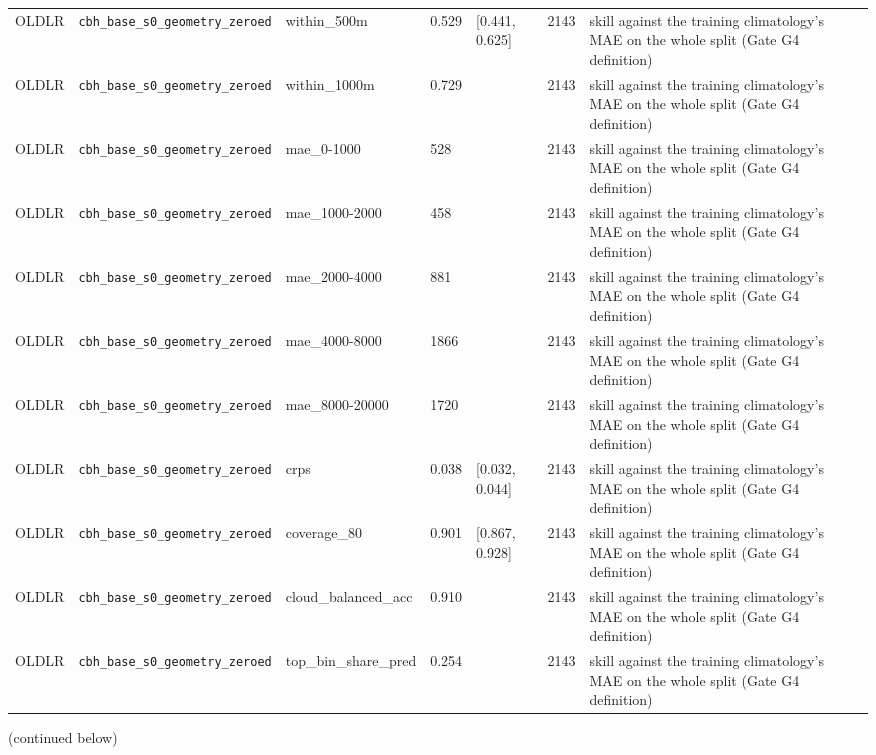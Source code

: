 \begin{center}
{\begin{tabular}{lp{2.4cm}llllp{7.3cm}}
OLDLR & \texttt{cbh\_\allowbreak{}base\_\allowbreak{}s0\_\allowbreak{}geometry\_\allowbreak{}zeroed} & within\_500m & 0.529 & [0.441, 0.625] & 2143 & skill against the training climatology's MAE on the whole split (Gate G4 definition) \\
OLDLR & \texttt{cbh\_\allowbreak{}base\_\allowbreak{}s0\_\allowbreak{}geometry\_\allowbreak{}zeroed} & within\_1000m & 0.729 &  & 2143 & skill against the training climatology's MAE on the whole split (Gate G4 definition) \\
OLDLR & \texttt{cbh\_\allowbreak{}base\_\allowbreak{}s0\_\allowbreak{}geometry\_\allowbreak{}zeroed} & mae\_0-1000 & 528 &  & 2143 & skill against the training climatology's MAE on the whole split (Gate G4 definition) \\
OLDLR & \texttt{cbh\_\allowbreak{}base\_\allowbreak{}s0\_\allowbreak{}geometry\_\allowbreak{}zeroed} & mae\_1000-2000 & 458 &  & 2143 & skill against the training climatology's MAE on the whole split (Gate G4 definition) \\
OLDLR & \texttt{cbh\_\allowbreak{}base\_\allowbreak{}s0\_\allowbreak{}geometry\_\allowbreak{}zeroed} & mae\_2000-4000 & 881 &  & 2143 & skill against the training climatology's MAE on the whole split (Gate G4 definition) \\
OLDLR & \texttt{cbh\_\allowbreak{}base\_\allowbreak{}s0\_\allowbreak{}geometry\_\allowbreak{}zeroed} & mae\_4000-8000 & 1866 &  & 2143 & skill against the training climatology's MAE on the whole split (Gate G4 definition) \\
OLDLR & \texttt{cbh\_\allowbreak{}base\_\allowbreak{}s0\_\allowbreak{}geometry\_\allowbreak{}zeroed} & mae\_8000-20000 & 1720 &  & 2143 & skill against the training climatology's MAE on the whole split (Gate G4 definition) \\
OLDLR & \texttt{cbh\_\allowbreak{}base\_\allowbreak{}s0\_\allowbreak{}geometry\_\allowbreak{}zeroed} & crps & 0.038 & [0.032, 0.044] & 2143 & skill against the training climatology's MAE on the whole split (Gate G4 definition) \\
OLDLR & \texttt{cbh\_\allowbreak{}base\_\allowbreak{}s0\_\allowbreak{}geometry\_\allowbreak{}zeroed} & coverage\_80 & 0.901 & [0.867, 0.928] & 2143 & skill against the training climatology's MAE on the whole split (Gate G4 definition) \\
OLDLR & \texttt{cbh\_\allowbreak{}base\_\allowbreak{}s0\_\allowbreak{}geometry\_\allowbreak{}zeroed} & cloud\_balanced\_acc & 0.910 &  & 2143 & skill against the training climatology's MAE on the whole split (Gate G4 definition) \\
OLDLR & \texttt{cbh\_\allowbreak{}base\_\allowbreak{}s0\_\allowbreak{}geometry\_\allowbreak{}zeroed} & top\_bin\_share\_pred & 0.254 &  & 2143 & skill against the training climatology's MAE on the whole split (Gate G4 definition) \\
\bottomrule
\end{tabular}}\par\footnotesize(continued below)
\end{center}

